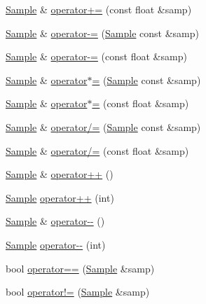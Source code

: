 \begin{DoxyCompactItemize}
\item 
\hyperlink{class_signal_1_1_sample}{Sample} \& \hyperlink{class_signal_1_1_sample_a7d9e82509a4d9df0106c3f683a556c83}{operator+=} (const float \&samp)
\item 
\hyperlink{class_signal_1_1_sample}{Sample} \& \hyperlink{class_signal_1_1_sample_aa242d4770f720623d6a7f7455d1230f2}{operator-\/=} (\hyperlink{class_signal_1_1_sample}{Sample} const \&samp)
\item 
\hyperlink{class_signal_1_1_sample}{Sample} \& \hyperlink{class_signal_1_1_sample_a5700d16aeba7eaacc851dd33954bc097}{operator-\/=} (const float \&samp)
\item 
\hyperlink{class_signal_1_1_sample}{Sample} \& \hyperlink{class_signal_1_1_sample_ab5c0df96056ee1a97de1c0cd8e4537e4}{operator$\ast$=} (\hyperlink{class_signal_1_1_sample}{Sample} const \&samp)
\item 
\hyperlink{class_signal_1_1_sample}{Sample} \& \hyperlink{class_signal_1_1_sample_a48ef3a75fadf8bc9a1d881d3e56629c3}{operator$\ast$=} (const float \&samp)
\item 
\hyperlink{class_signal_1_1_sample}{Sample} \& \hyperlink{class_signal_1_1_sample_aa25e485265561cc1b72540db13e7de60}{operator/=} (\hyperlink{class_signal_1_1_sample}{Sample} const \&samp)
\item 
\hyperlink{class_signal_1_1_sample}{Sample} \& \hyperlink{class_signal_1_1_sample_a40646177e45aa55e547b0109e1f4103c}{operator/=} (const float \&samp)
\item 
\hyperlink{class_signal_1_1_sample}{Sample} \& \hyperlink{class_signal_1_1_sample_ae59af6172226531fd5b7fb4dec32b04c}{operator++} ()
\item 
\hyperlink{class_signal_1_1_sample}{Sample} \hyperlink{class_signal_1_1_sample_a685283f98cd72d2b0b281eaca0eb18fc}{operator++} (int)
\item 
\hyperlink{class_signal_1_1_sample}{Sample} \& \hyperlink{class_signal_1_1_sample_a4357ffac71ce9bb92ea771483a82e157}{operator-\/-\/} ()
\item 
\hyperlink{class_signal_1_1_sample}{Sample} \hyperlink{class_signal_1_1_sample_aa2572994e3ad3c7edff5336a7937a7e1}{operator-\/-\/} (int)
\item 
bool \hyperlink{class_signal_1_1_sample_a9a3b4c31bff60e6861e833a1f9c46df7}{operator==} (\hyperlink{class_signal_1_1_sample}{Sample} \&samp)
\item 
bool \hyperlink{class_signal_1_1_sample_a1c06d852edfeade895c5f4935357cf73}{operator!=} (\hyperlink{class_signal_1_1_sample}{Sample} \&samp)
\end{DoxyCompactItemize}
